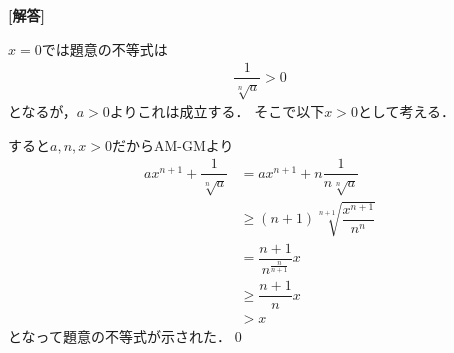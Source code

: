 \documentclass[../../main.tex]{subfiles}
\begin{document}
\begin{oframed}
  
\end{oframed}

{\bf [解答]}

$x=0$では題意の不等式は
\begin{align}
  \dfrac{1}{\sqrt[n]{a}} > 0
\end{align}
となるが，$a>0$よりこれは成立する．
そこで以下$x > 0$として考える．

すると$a,n,x>0$だからAM-GMより
\begin{align}
  ax^{n+1}+\dfrac{1}{\sqrt[n]{a}}&=ax^{n+1}+n\dfrac{1}{n\sqrt[n]{a}}  \\
  &\ge (n+1)\sqrt[n+1]{\dfrac{x^{n+1}}{n^n}}  \\
  &=\dfrac{n+1}{n^{\frac{n}{n+1}}}x  \\
  &\ge \dfrac{n+1}{n}x  \\
  &>x
\end{align}
となって題意の不等式が示された．\qed
\newpage
\end{document}
